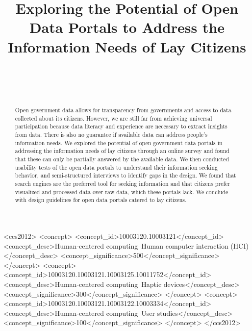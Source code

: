 \documentclass{sigchi}
\def\plaintitle{Exploring the Potential of Open Data Portals to Address the Information Needs of Lay Citizens}
\begin{document}
\title{\plaintitle}

\author{%
  \\
  \\
  \\
}

\maketitle

\begin{abstract}
Open government data allows for transparency from governments and access to data collected about its citizens. However, we are still far from achieving universal participation because data literacy and experience are necessary to extract insights from data. There is also no guarantee if available data can address people’s information needs. We explored the potential of open government data portals in addressing the information needs of lay citizens through an online survey and found that these can only be partially answered by the available data. We then conducted usability tests of the open data portals to understand their information seeking behavior, and semi-structured interviews to identify gaps in the design. We found that search engines are the preferred tool for seeking information and that citizens prefer visualized and processed data over raw data, which these portals lack. We conclude with design guidelines for open data portals catered to lay citizens.
\end{abstract}



\begin{CCSXML}
<ccs2012>
<concept>
<concept_id>10003120.10003121</concept_id>
<concept_desc>Human-centered computing~Human computer interaction (HCI)</concept_desc>
<concept_significance>500</concept_significance>
</concept>
<concept>
<concept_id>10003120.10003121.10003125.10011752</concept_id>
<concept_desc>Human-centered computing~Haptic devices</concept_desc>
<concept_significance>300</concept_significance>
</concept>
<concept>
<concept_id>10003120.10003121.10003122.10003334</concept_id>
<concept_desc>Human-centered computing~User studies</concept_desc>
<concept_significance>100</concept_significance>
</concept>
</ccs2012>
\end{CCSXML}
\end{document}
